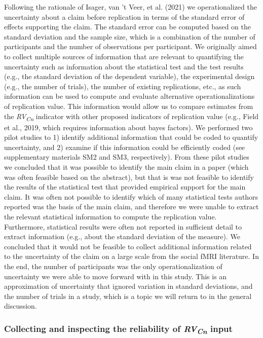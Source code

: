 \documentclass[
  man,floatsintext]{apa6}
\begin{document}
Following the rationale of Isager, van 't Veer, et al. (2021) we operationalized the uncertainty about a claim before replication in terms of the standard error of effects supporting the claim. The standard error can be computed based on the standard deviation and the sample size, which is a combination of the number of participants and the number of observations per participant. We originally aimed to collect multiple sources of information that are relevant to quantifying the uncertainty such as information about the statistical test and the test results (e.g., the standard deviation of the dependent variable), the experimental design (e.g., the number of trials), the number of existing replications, etc., as such information can be used to compute and evaluate alternative operationalizations of replication value. This information would allow us to compare estimates from the \emph{RV\textsubscript{Cn}} indicator with other proposed indicators of replication value (e.g., Field et al., 2019, which requires information about bayes factors). We performed two pilot studies to 1) identify additional information that could be coded to quantify uncertainty, and 2) examine if this information could be efficiently coded (see supplementary materials SM2 and SM3, respectively). From these pilot studies we concluded that it was possible to identify the main claim in a paper (which was often feasible based on the abstract), but that is was not feasible to identify the results of the statistical test that provided empirical support for the main claim. It was often not possible to identify which of many statistical tests authors reported was the basis of the main claim, and therefore we were unable to extract the relevant statistical information to compute the replication value. Furthermore, statistical results were often not reported in sufficient detail to extract information (e.g., about the standard deviation of the measure). We concluded that it would not be feasible to collect additional information related to the uncertainty of the claim on a large scale from the social fMRI literature. In the end, the number of participants was the only operationalization of uncertainty we were able to move forward with in this study. This is an approximation of uncertainty that ignored variation in standard deviations, and the number of trials in a study, which is a topic we will return to in the general discussion.

\hypertarget{collecting-and-inspecting-the-reliability-of-rvcn-input}{%
\subsubsection{\texorpdfstring{Collecting and inspecting the reliability of \emph{RV\textsubscript{Cn}} input}{Collecting and inspecting the reliability of RVCn input}}\label{collecting-and-inspecting-the-reliability-of-rvcn-input}}
\end{document}
